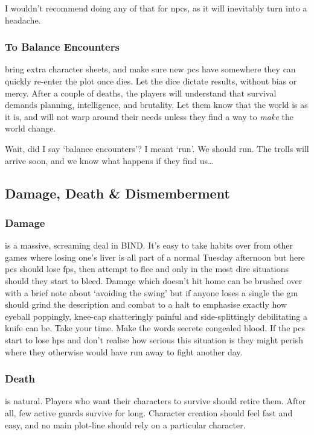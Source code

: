\begin{multicols}{2}
I wouldn't recommend doing any of that for \glspl{npc}, as it will inevitably turn into a headache.

\subsubsection{To Balance Encounters}
bring extra character sheets, and make sure new \glspl{pc} have somewhere they can quickly re-enter the plot once  dies.
Let the dice dictate results, without bias or mercy.
After a couple of deaths, the players will understand that survival demands planning, intelligence, and brutality.
Let them know that the world is as it is, and will not warp around their needs unless they find a way to \emph{make} the world change.

Wait, did I say `balance encounters'?
I meant `run'.
We should run.
The trolls will arrive soon, and we know what happens if they find us\ldots

\subsection{Damage, Death \& Dismemberment}

\subsubsection{Damage}
is a massive, screaming deal in BIND.
It's easy to take habits over from other games where losing one's liver is all part of a normal Tuesday afternoon but here \glspl{pc} should lose \glspl{fp}, then attempt to flee and only in the most dire situations should they start to bleed.
Damage which doesn't hit home can be brushed over with a brief note about `avoiding the swing' but if anyone loses a single  the \gls{gm} should grind the description and combat to a halt to emphasise exactly how eyeball poppingly, knee-cap shatteringly painful and side-splittingly debilitating a knife can be.
Take your time.
Make the words secrete congealed blood.
If the \glspl{pc} start to lose \glspl{hp} and don't realise how serious this situation is they might perish where they otherwise would have run away to fight another day.

\subsubsection{Death}
\label{pcdeath}
is natural.
Players who want their characters to survive should retire them.
After all, few active \glspl{guard} survive for long.
Character creation should feel fast and easy, and no main plot-line should rely on a particular character.


\end{multicols}
